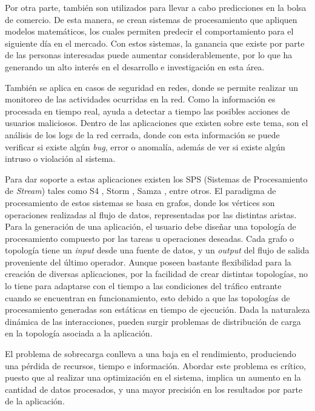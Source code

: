 Por otra parte, tambi\'en son utilizados para llevar a cabo predicciones en la bolsa de comercio\normalsize{. De esta manera,} se crean sistemas de procesamiento que apliquen modelos matem\'aticos, los cuales permiten predecir el comportamiento para el siguiente d\'ia en el mercado. Con estos sistemas, la ganancia que existe por parte de las personas interesadas puede aumentar considerablemente, por lo que ha generando un alto inter\'es en el desarrollo e investigaci\'on en esta \'area.

Tambi\'en se aplica en casos de seguridad en redes, donde se permite realizar un monitoreo de las actividades ocurridas en la red. Como la informaci\'on es procesada en tiempo real, ayuda a detectar a tiempo las posibles acciones de usuarios maliciosos. Dentro de las aplicaciones que existen sobre este tema, \normalsize{son el an\'alisis de los logs de la red cerrada}, donde con esta informaci\'on se puede verificar si existe alg\'un \textit{bug}, error o anomal\'ia, adem\'as de ver si existe alg\'un intruso o violaci\'on al sistema.

Para dar soporte a estas aplicaciones existen los SPS (Sistemas de Procesamiento de \textit{Stream}) tales como S4 \citep{s4yahoo}, Storm \citep{stormtwitter}, Samza \citep{samza}, entre otros. El paradigma de procesamiento de estos sistemas se basa en grafos, donde los v\'ertices son operaciones realizadas al flujo de datos, representadas por las distintas aristas. Para la generaci\'on de una aplicaci\'on, el usuario debe dise\~nar una topolog\'ia de procesamiento compuesto por las tareas u operaciones deseadas. Cada grafo o topolog\'ia tiene un \textit{input} desde una fuente de datos, y un \textit{output} del flujo de salida proveniente del \'ultimo operador. Aunque poseen bastante flexibilidad para la creaci\'on de diversas aplicaciones, por la facilidad de crear distintas topolog\'ias, no lo tiene para adaptarse con el tiempo a las condiciones del tr\'afico \normalsize{entrante} cuando se encuentran en funcionamiento, esto debido a que las topolog\'ias de procesamiento generadas son est\'aticas en tiempo de ejecuci\'on. Dada la naturaleza din\'amica de las interacciones, pueden surgir problemas de distribuci\'on de carga en la topolog\'ia asociada a la aplicaci\'on.

El problema de sobrecarga conlleva a una baja en el rendimiento, produciendo una p\'erdida de recursos, tiempo e informaci\'on. Abordar este problema es cr\'itico, puesto que al realizar una optimizaci\'on en el sistema, implica un aumento en la cantidad de datos procesados, y una mayor precisi\'on en los resultados por parte de la aplicaci\'on.

